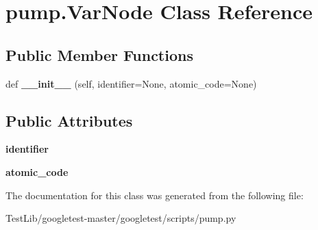 \hypertarget{classpump_1_1VarNode}{}\section{pump.\+Var\+Node Class Reference}
\label{classpump_1_1VarNode}
\subsection*{Public Member Functions}
\begin{DoxyCompactItemize}
\item 
\mbox{\label{classpump_1_1VarNode_adf79bf21b1db5367792a4ac91f94a756}} 
def {\bfseries \+\_\+\+\_\+init\+\_\+\+\_\+} (self, identifier=None, atomic\+\_\+code=None)
\end{DoxyCompactItemize}
\subsection*{Public Attributes}
\begin{DoxyCompactItemize}
\item 
\mbox{\label{classpump_1_1VarNode_aa2b634e2443646c3754f2d193efa4dc7}} 
{\bfseries identifier}
\item 
\mbox{\label{classpump_1_1VarNode_ad6bef6a8577b994fbe9ccddf3c82d2fc}} 
{\bfseries atomic\+\_\+code}
\end{DoxyCompactItemize}


The documentation for this class was generated from the following file\+:\begin{DoxyCompactItemize}
\item 
Test\+Lib/googletest-\/master/googletest/scripts/pump.\+py\end{DoxyCompactItemize}
